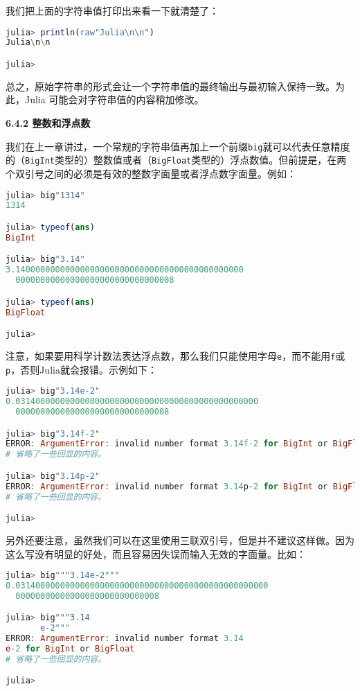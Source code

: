 我们把上面的字符串值打印出来看一下就清楚了：
\begin{lstlisting}[language=julia]
julia> println(raw"Julia\n\n")
Julia\n\n

julia> 
\end{lstlisting}

总之，原始字符串的形式会让一个字符串值的最终输出与最初输入保持一致。为此，Julia 可能会对字符串值的内容稍加修改。

\textbf{6.4.2 整数和浮点数}

我们在上一章讲过，一个常规的字符串值再加上一个前缀\verb`big`就可以代表任意精度的（\verb`BigInt`类型的）整数值或者（\verb`BigFloat`类型的）浮点数值。但前提是，在两个双引号之间的必须是有效的整数字面量或者浮点数字面量。例如：
\begin{lstlisting}[language=julia]
julia> big"1314"
1314

julia> typeof(ans)
BigInt

julia> big"3.14"
3.1400000000000000000000000000000000000000000000
  00000000000000000000000000000008

julia> typeof(ans)
BigFloat

julia> 
\end{lstlisting}

注意，如果要用科学计数法表达浮点数，那么我们只能使用字母\verb`e`，而不能用\verb`f`或\verb`p`，否则Julia就会报错。示例如下：
\begin{lstlisting}[language=julia]
julia> big"3.14e-2"
0.0314000000000000000000000000000000000000000000000
  0000000000000000000000000000008

julia> big"3.14f-2"
ERROR: ArgumentError: invalid number format 3.14f-2 for BigInt or BigFloat
# 省略了一些回显的内容。

julia> big"3.14p-2"
ERROR: ArgumentError: invalid number format 3.14p-2 for BigInt or BigFloat
# 省略了一些回显的内容。

julia> 
\end{lstlisting}

另外还要注意，虽然我们可以在这里使用三联双引号，但是并不建议这样做。因为这么写没有明显的好处，而且容易因失误而输入无效的字面量。比如：
\begin{lstlisting}[language=julia]
julia> big"""3.14e-2"""
0.031400000000000000000000000000000000000000000000000
  00000000000000000000000000008

julia> big"""3.14
       e-2"""
ERROR: ArgumentError: invalid number format 3.14
e-2 for BigInt or BigFloat
# 省略了一些回显的内容。

julia> 
\end{lstlisting}

